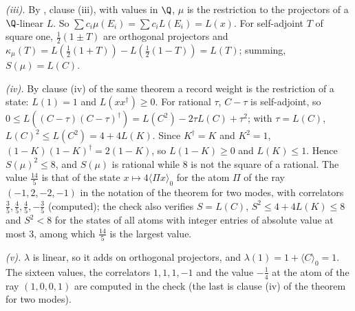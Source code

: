 \emph{(iii).} By , clause (iii), with values in $\Q$, $\mu$ is the restriction to the projectors of a $\Q$-linear $L$. So $\sum c_{i}\mu(E_{i}) = \sum c_{i}L(E_{i}) = L(x)$. For self-adjoint $T$ of square one, $\tfrac12(1 \pm T)$ are orthogonal projectors and $\kappa_{\mu}(T) = L(\tfrac12(1 + T)) - L(\tfrac12(1 - T)) = L(T)$; summing, $S(\mu) = L(C)$.

\emph{(iv).} By clause (iv) of the same theorem a record weight is the restriction of a state: $L(1) = 1$ and $L(xx^{\dagger}) \ge 0$. For rational $\tau$, $C - \tau$ is self-adjoint, so $0 \le L((C - \tau)(C - \tau)^{\dagger}) = L(C^{2}) - 2\tau L(C) + \tau^{2}$; with $\tau = L(C)$, $L(C)^{2} \le L(C^{2}) = 4 + 4L(K)$. Since $K^{\dagger} = K$ and $K^{2} = 1$, $(1 - K)(1 - K)^{\dagger} = 2(1 - K)$, so $L(1 - K) \ge 0$ and $L(K) \le 1$. Hence $S(\mu)^{2} \le 8$, and $S(\mu)$ is rational while $8$ is not the square of a rational. The value $\tfrac{14}{5}$ is that of the state $x \mapsto 4\langle\Pi x\rangle_{0}$ for the atom $\Pi$ of the ray $(-1, 2, -2, -1)$ in the notation of the theorem for two modes, with correlators $\tfrac35, \tfrac45, \tfrac45, -\tfrac35$ (computed); the check also verifies $S = L(C)$, $S^{2} \le 4 + 4L(K) \le 8$ and $S^{2} < 8$ for the states of all atoms with integer entries of absolute value at most $3$, among which $\tfrac{14}{5}$ is the largest value.

\emph{(v).} $\lambda$ is linear, so it adds on orthogonal projectors, and $\lambda(1) = 1 + \langle C\rangle_{0} = 1$. The sixteen values, the correlators $1, 1, 1, -1$ and the value $-\tfrac14$ at the atom of the ray $(1, 0, 0, 1)$ are computed in the check (the last is clause (iv) of the theorem for two modes).
